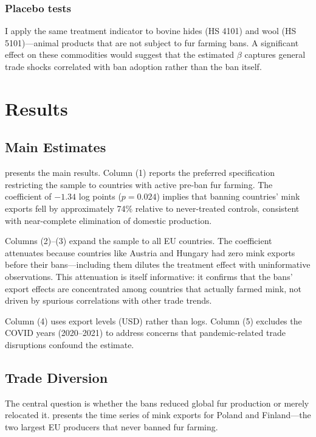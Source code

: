 \documentclass[12pt]{article}
\begin{document}
\subsubsection*{Placebo tests} I apply the same treatment indicator to bovine hides (HS 4101) and wool (HS 5101)---animal products that are not subject to fur farming bans. A significant effect on these commodities would suggest that the estimated $\beta$ captures general trade shocks correlated with ban adoption rather than the ban itself.


\section{Results}\label{sec:results}

\subsection{Main Estimates}

 presents the main results. Column (1) reports the preferred specification restricting the sample to countries with active pre-ban fur farming. The coefficient of $-1.34$ log points ($p = 0.024$) implies that banning countries' mink exports fell by approximately 74\% relative to never-treated controls, consistent with near-complete elimination of domestic production.

Columns (2)--(3) expand the sample to all EU countries. The coefficient attenuates because countries like Austria and Hungary had zero mink exports before their bans---including them dilutes the treatment effect with uninformative observations. This attenuation is itself informative: it confirms that the bans' export effects are concentrated among countries that actually farmed mink, not driven by spurious correlations with other trade trends.

Column (4) uses export levels (USD) rather than logs. Column (5) excludes the COVID years (2020--2021) to address concerns that pandemic-related trade disruptions confound the estimate.



\subsection{Trade Diversion}

The central question is whether the bans reduced global fur production or merely relocated it.  presents the time series of mink exports for Poland and Finland---the two largest EU producers that never banned fur farming.
\end{document}
